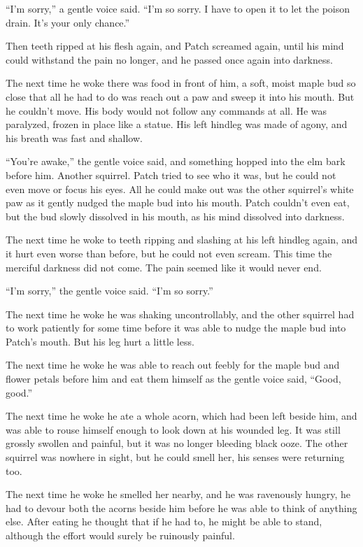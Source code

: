 \documentclass[ebook,oneside,openany,17pt]{memoir}
\begin{document}
“I’m sorry,” a gentle voice said. “I’m so sorry. I have to open it to
let the poison drain. It’s your only chance.”

Then teeth ripped at his flesh again, and Patch screamed again, until
his mind could withstand the pain no longer, and he passed once again
into darkness.

The next time he woke there was food in front of him, a soft, moist
maple bud so close that all he had to do was reach out a paw and sweep
it into his mouth. But he couldn’t move. His body would not follow any
commands at all. He was paralyzed, frozen in place like a statue. His
left hindleg was made of agony, and his breath was fast and shallow.

“You’re awake,” the gentle voice said, and something hopped into the
elm bark before him. Another squirrel. Patch tried to see who it was,
but he could not even move or focus his eyes. All he could make out
was the other squirrel’s white paw as it gently nudged the maple bud
into his mouth. Patch couldn’t even eat, but the bud slowly dissolved
in his mouth, as his mind dissolved into darkness.

The next time he woke to teeth ripping and slashing at his left
hindleg again, and it hurt even worse than before, but he could not
even scream. This time the merciful darkness did not come. The pain
seemed like it would never end.

“I’m sorry,” the gentle voice said. “I’m so sorry.”

The next time he woke he was shaking uncontrollably, and the other
squirrel had to work patiently for some time before it was able to
nudge the maple bud into Patch’s mouth. But his leg hurt a little
less.

The next time he woke he was able to reach out feebly for the maple
bud and flower petals before him and eat them himself as the gentle
voice said, “Good, good.”

The next time he woke he ate a whole acorn, which had been left beside
him, and was able to rouse himself enough to look down at his wounded
leg. It was still grossly swollen and painful, but it was no longer
bleeding black ooze. The other squirrel was nowhere in sight, but he
could smell her, his senses were returning too.

The next time he woke he smelled her nearby, and he was ravenously
hungry, he had to devour both the acorns beside him before he was able
to think of anything else. After eating he thought that if he had to,
he might be able to stand, although the effort would surely be
ruinously painful.
\end{document}
